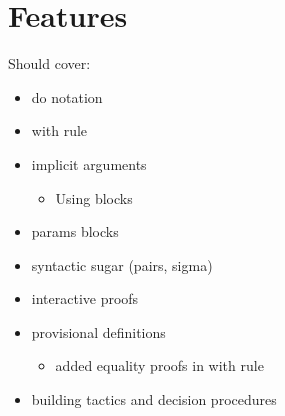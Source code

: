 \section{Features}

Should cover:

\begin{itemize}
\item do notation
\item with rule
\item implicit arguments
\begin{itemize}
\item Using blocks
\end{itemize}
\item params blocks
\item syntactic sugar (pairs, sigma)
\item interactive proofs
\item provisional definitions
\begin{itemize}
\item added equality proofs in with rule
\end{itemize}
\item building tactics and decision procedures
\end{itemize}